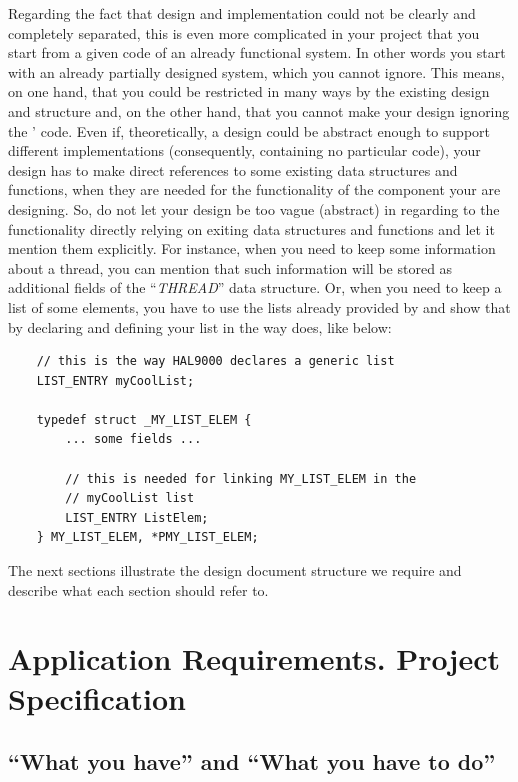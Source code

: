 Regarding the fact that design and implementation could not be clearly and completely separated, this is even more complicated in your \OSName{} project that you start from a given code of an already functional system. In other words you start with an already partially designed system, which you cannot ignore. This means, on one hand, that you could be restricted in many ways by the existing design and \OSName{} structure and, on the other hand, that you cannot make your design ignoring the \OSName{}' code. Even if, theoretically, a design could be abstract enough to support different implementations (consequently, containing no particular code), your \OSName{} design has to make direct references to some existing data structures and functions, when they are needed for the functionality of the \OSName{} component your are designing. So, do not let your design be too vague (abstract) in regarding to the functionality directly relying on exiting data structures and functions and let it mention them explicitly. For instance, when you need to keep some information about a thread, you can mention that such information will be stored as additional fields of the ``\textit{THREAD}'' data structure. Or, when you need to keep a list of some elements, you have to use the lists already provided by \OSName{} and show that by declaring and defining your list in the way \OSName{} does, like below:

\begin{lstlisting}
	// this is the way HAL9000 declares a generic list
	LIST_ENTRY myCoolList;

	typedef struct _MY_LIST_ELEM {
		... some fields ...

		// this is needed for linking MY_LIST_ELEM in the 
		// myCoolList list
		LIST_ENTRY ListElem;
	} MY_LIST_ELEM, *PMY_LIST_ELEM;
\end{lstlisting}

The next sections illustrate the design document structure we require and describe what each section should refer to.


\section{Application Requirements. Project Specification}


\subsection{``What you have'' and  ``What you have to do''}

